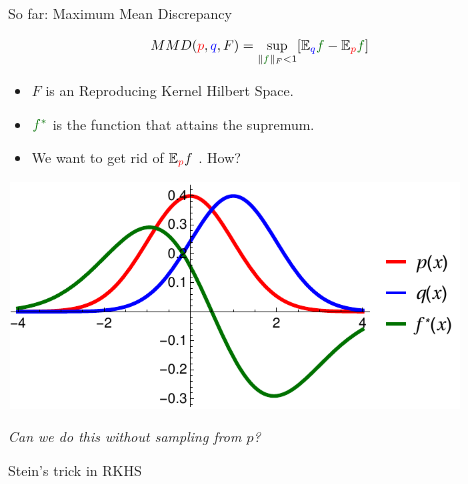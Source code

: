 \begin{frame}
\begin{columns}
\begin{column}{.33\linewidth}
\begin{block}{So far: Maximum Mean Discrepancy}
\begin{minipage}{.60\linewidth}
\vspace{1cm}
\large
\begin{align*}
MMD({\color{red} p},{ \color{blue} q},F) = \sup_{   \| {\color{mg}f} \|_F<1} [\ev_{{ \color{blue} q}}{\color{mg}f}- \ev_{{\color{red} p}}{\color{mg} f}]   
\end{align*}
\normalsize
\vspace{1cm}
 \begin{itemize}
  \item $F$ is an Reproducing Kernel Hilbert Space.
  \item ${\color{mg} f^*}$ is the function that attains the supremum.
  \item We want to get rid of  $\mathbb{E}_{ {\color{red} p} }f$ . How?
 \end{itemize}

\end{minipage}
\begin{minipage}{.35\linewidth}

\begin{center}
\vspace{-1cm}
\hspace{-2.5cm}
\includegraphics[width=12cm,height=6cm]{../../presentation/img/mmd.pdf}
\end{center}
\end{minipage}
\vspace{1cm}
\begin{center}
\emph{Can we do this without sampling from $p$?}
\end{center}
\end{block}
\vspace{-0.75cm}
\begin{block}{Stein's trick in RKHS}


\end{block}
\end{column}
\end{columns}
\end{frame}
